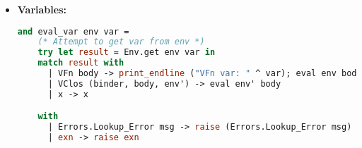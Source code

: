 \documentclass{l4proj}
\begin{document}
\begin{itemize}
    \item \textbf{Variables:}
    
    \begin{lstlisting}[language=Caml, caption=The PyFunc interpreter's rule for variables.]
    and eval_var env var =
    (* Attempt to get var from env *)
    try let result = Env.get env var in
    match result with
      | VFn body -> print_endline ("VFn var: " ^ var); eval env body
      | VClos (binder, body, env') -> eval env' body
      | x -> x

    with
      | Errors.Lookup_Error msg -> raise (Errors.Lookup_Error msg)
      | exn -> raise exn
\end{lstlisting}

\end{itemize}














\end{document}
